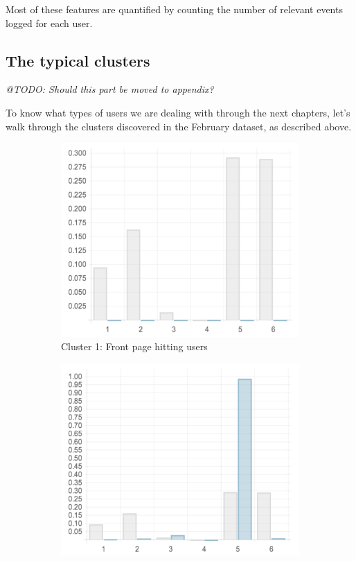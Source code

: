 Most of these features are quantified by counting the number of relevant events logged for each user.

\subsection{The typical clusters}
\label{eval:sec:typical_clusters}

\emph{@TODO: Should this part be moved to appendix?}

To know what types of users we are dealing with through the next chapters, let's walk through the clusters discovered in the February dataset, as described above.

\begin{figure}
  \centering
  \begin{subfigure}[t]{0.45\textwidth}
    \includegraphics[width=\textwidth]{Figures/clusterings/confluence-post/cluster1-chart}
    \caption{Cluster 1: Front page hitting users}
    \label{fig:cluster1-chart}
  \end{subfigure}
  \hfill
  \begin{subfigure}[t]{0.45\textwidth}
    \includegraphics[width=\textwidth]{Figures/clusterings/confluence-post/cluster2-chart}

\end{subfigure}
\end{figure}
